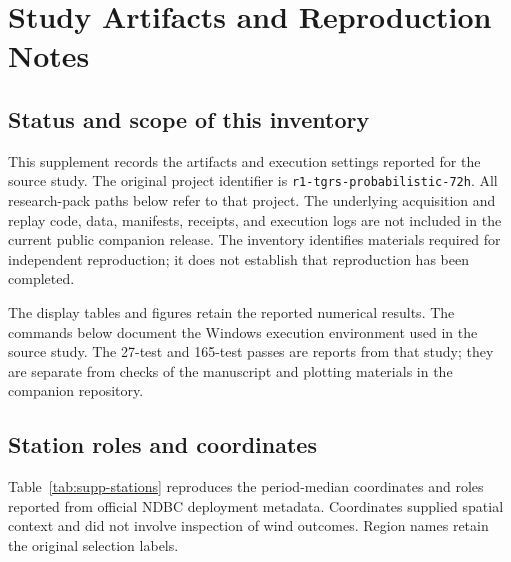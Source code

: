 \section{Study Artifacts and Reproduction Notes}
\label{sec:supp-evidence}

\subsection{Status and scope of this inventory}
This supplement records the artifacts and execution settings reported for the source study. The original project identifier is \texttt{r1-tgrs-probabilistic-72h}. All research-pack paths below refer to that project. The underlying acquisition and replay code, data, manifests, receipts, and execution logs are not included in the current public companion release. The inventory identifies materials required for independent reproduction; it does not establish that reproduction has been completed.

The display tables and figures retain the reported numerical results. The commands below document the Windows execution environment used in the source study. The 27-test and 165-test passes are reports from that study; they are separate from checks of the manuscript and plotting materials in the companion repository.

\subsection{Station roles and coordinates}
Table~\ref{tab:supp-stations} reproduces the period-median coordinates and roles reported from official NDBC deployment metadata. Coordinates supplied spatial context and did not involve inspection of wind outcomes. Region names retain the original selection labels.

